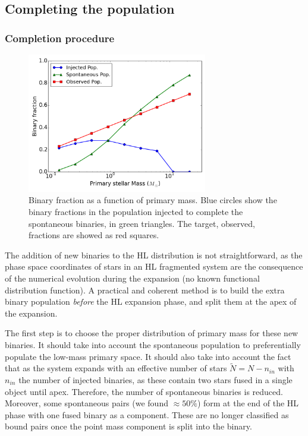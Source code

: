 \subsection{Completing the population}
\label{Sec:Completing}

\subsubsection*{Completion procedure}



\begin{figure}
\begin{center}
\includegraphics[width=0.7\textwidth]{Figures/5_injected_fraction}
\caption[Injected binary population to complete the spontaneous distribution]{Binary fraction as a function of primary mass. Blue circles show the binary fractions in the population injected to complete the spontaneous binaries, in green triangles. The target, observed, fractions are showed as red squares. }
\label{Fig:5_injected}
\end{center}
\end{figure}


The addition of new binaries to the HL distribution is not straightforward, as the phase space coordinates of stars in an HL fragmented system are the consequence of the numerical evolution during the expansion (no known functional distribution function). A practical and coherent method is to build the extra binary population \textit{before} the HL expansion phase, and split them at the apex of the expansion.

The first step is to choose the proper distribution of primary mass for these new binaries. It should take into account the spontaneous population to preferentially populate the low-mass primary space. It should also take into account the fact that as the system expands with an effective number of stars $\tilde{N} = N - n_{in}$ with $n_{in}$ the number of injected binaries, as these contain two stars fused in a single object until apex. Therefore, the number of spontaneous binaries is reduced. Moreover, some spontaneous pairs (we found $\approx 50\%$) form at the end of the HL phase with one fused binary as a component. These are no longer classified as bound pairs  once the point mass component is split into the binary. 






